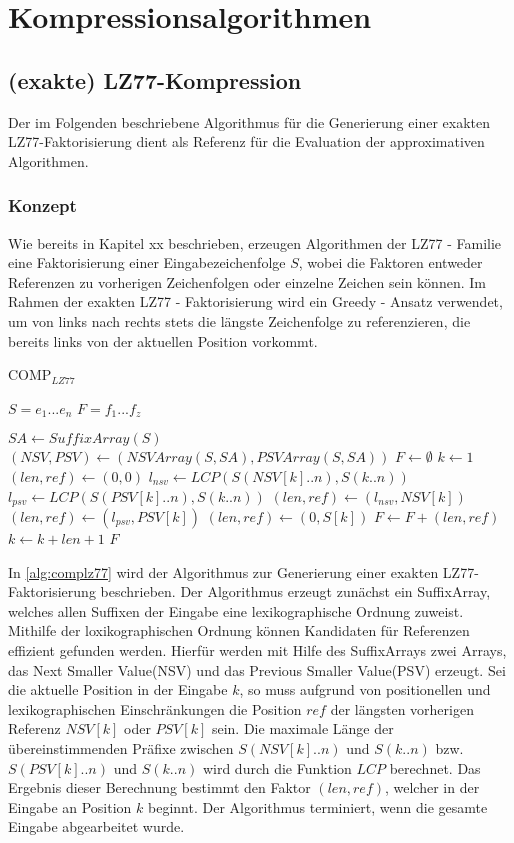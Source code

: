 \chapter{Kompressionsalgorithmen}

\section{(exakte) LZ77-Kompression}
Der im Folgenden beschriebene Algorithmus für die Generierung einer exakten LZ77-Faktorisierung dient als Referenz für die Evaluation der approximativen Algorithmen.

\subsection{Konzept}
Wie bereits in Kapitel xx beschrieben, erzeugen Algorithmen der LZ77 - Familie eine Faktorisierung einer Eingabezeichenfolge $S$, wobei die Faktoren entweder Referenzen
zu vorherigen Zeichenfolgen oder einzelne Zeichen sein können. Im Rahmen der exakten LZ77 - Faktorisierung wird ein Greedy - Ansatz verwendet, um von links nach rechts 
stets die längste Zeichenfolge zu referenzieren, die bereits links von der aktuellen Position vorkommt.
\begin{algorithm}
\centering
\caption{COMP$_{LZ77}$} \label{alg:complz77}
\algorithmicrequire $S=e_1...e_n$
\algorithmicensure $F=f_1...f_z$
\begin{algorithmic}
    \STATE $SA \gets SuffixArray(S)$
    \STATE $(NSV, PSV) \gets (NSVArray(S, SA), PSVArray(S, SA))$
    \STATE $F \gets \emptyset$
    \STATE $k \gets 1$
    \STATE $(len, ref) \gets (0, 0)$
    \STATE $l_{nsv} \gets LCP(S(NSV[k]..n), S(k..n))$
    \STATE $l_{psv} \gets LCP(S(PSV[k]..n), S(k..n))$
        \STATE $(len, ref) \gets (l_{nsv}, NSV[k])$
        \STATE $(len, ref) \gets (l_{psv}, PSV[k])$
    \ELSE
        \STATE $(len, ref) \gets (0, S[k])$
    \ENDIF
    \STATE $F \gets F + (len, ref)$
    \STATE $k \gets k + len + 1$
    \ENDWHILE
    \RETURN $F$
\end{algorithmic}
\end{algorithm}
In \ref{alg:complz77} wird der Algorithmus zur Generierung einer exakten LZ77-Faktorisierung beschrieben. Der Algorithmus erzeugt zunächst ein SuffixArray, welches allen
Suffixen der Eingabe eine lexikographische Ordnung zuweist. Mithilfe der loxikographischen Ordnung können Kandidaten für Referenzen effizient gefunden werden. Hierfür 
werden mit Hilfe des SuffixArrays zwei Arrays, das Next Smaller Value(NSV) und das Previous Smaller Value(PSV) erzeugt. Sei die aktuelle Position in der Eingabe $k$, so
muss aufgrund von positionellen und lexikographischen Einschränkungen die Position $ref$ der längsten vorherigen Referenz $NSV[k]$ oder $PSV[k]$ sein. Die maximale
Länge der übereinstimmenden Präfixe zwischen $S(NSV[k]..n)$ und $S(k..n)$ bzw. $S(PSV[k]..n)$ und $S(k..n)$ wird durch die Funktion $LCP$ berechnet. Das Ergebnis
dieser Berechnung bestimmt den Faktor $(len, ref)$, welcher in der Eingabe an Position $k$ beginnt. Der Algorithmus terminiert, wenn die gesamte Eingabe abgearbeitet wurde.

